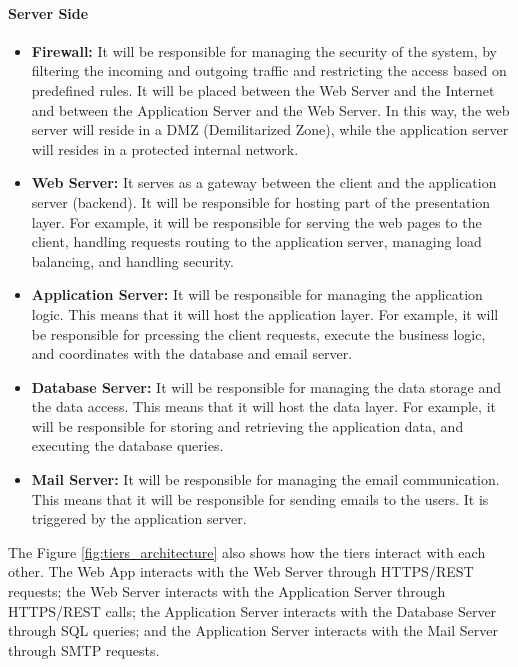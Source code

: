 \paragraph{Server Side}
\begin{itemize}
    \item \textbf{Firewall:} It will be responsible for managing the security of the system, by filtering the incoming and outgoing traffic and restricting
    the access based on predefined rules. It will be placed between the Web Server and the Internet and between the Application Server and the Web Server.
    In this way, the web server will reside in a DMZ (Demilitarized Zone), while the application server will resides in a protected internal network.
    \item \textbf{Web Server:} It serves as a gateway between the client and the application server (backend). It will be responsible for hosting part 
    of the presentation layer. For example, it will be responsible for serving the web pages to the client, handling requests routing to the application
    server, managing load balancing, and handling security.
    \item \textbf{Application Server:} It will be responsible for managing the application logic. This means that it will host the application layer. For 
    example, it will be responsible for prcessing the client requests, execute the business logic, and coordinates with the database and email server.
    \item \textbf{Database Server:} It will be responsible for managing the data storage and the data access. This means that it will host the data layer.
    For example, it will be responsible for storing and retrieving the application data, and executing the database queries.
    \item \textbf{Mail Server:} It will be responsible for managing the email communication. This means that it will be responsible for sending emails to 
    the users. It is triggered by the application server.
\end{itemize}

The Figure \ref{fig:tiers_architecture} also shows how the tiers interact with each other. The Web App interacts with the Web Server through HTTPS/REST 
requests; the Web Server interacts with the Application Server through HTTPS/REST calls; the Application Server interacts with the Database Server through 
SQL queries; and the Application Server interacts with the Mail Server through SMTP requests.

